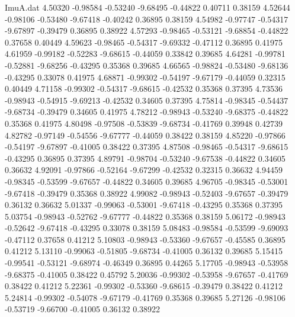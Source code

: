 \begin{filecontents}{ImuA.dat}
   4.50320   -0.98584   -0.53240   -9.68495   -0.44822    0.40711    0.38159
   4.52644   -0.98106   -0.53480   -9.67418   -0.40242    0.36895    0.38159
   4.54982   -0.97747   -0.54317   -9.67897   -0.39479    0.36895    0.38922
   4.57293   -0.98465   -0.53121   -9.68854   -0.44822    0.37658    0.40449
   4.59623   -0.98465   -0.54317   -9.69332   -0.47112    0.36895    0.41975
   4.61959   -0.99182   -0.52283   -9.68615   -0.44059    0.33842    0.39685
   4.64281   -0.99781   -0.52881   -9.68256   -0.43295    0.35368    0.39685
   4.66565   -0.98824   -0.53480   -9.68136   -0.43295    0.33078    0.41975
   4.68871   -0.99302   -0.54197   -9.67179   -0.44059    0.32315    0.40449
   4.71158   -0.99302   -0.54317   -9.68615   -0.42532    0.35368    0.37395
   4.73536   -0.98943   -0.54915   -9.69213   -0.42532    0.34605    0.37395
   4.75814   -0.98345   -0.54437   -9.68734   -0.39479    0.34605    0.41975
   4.78212   -0.98943   -0.53240   -9.68375   -0.44822    0.35368    0.41975
   4.80498   -0.97508   -0.53839   -9.68734   -0.41769    0.39948    0.42739
   4.82782   -0.97149   -0.54556   -9.67777   -0.44059    0.38422    0.38159
   4.85220   -0.97866   -0.54197   -9.67897   -0.41005    0.38422    0.37395
   4.87508   -0.98465   -0.54317   -9.68615   -0.43295    0.36895    0.37395
   4.89791   -0.98704   -0.53240   -9.67538   -0.44822    0.34605    0.36632
   4.92091   -0.97866   -0.52164   -9.67299   -0.42532    0.32315    0.36632
   4.94459   -0.98345   -0.53599   -9.67657   -0.44822    0.34605    0.39685
   4.96705   -0.98345   -0.53001   -9.67418   -0.39479    0.35368    0.38922
   4.99082   -0.98943   -0.52403   -9.67657   -0.39479    0.36132    0.36632
   5.01337   -0.99063   -0.53001   -9.67418   -0.43295    0.35368    0.37395
   5.03754   -0.98943   -0.52762   -9.67777   -0.44822    0.35368    0.38159
   5.06172   -0.98943   -0.52642   -9.67418   -0.43295    0.33078    0.38159
   5.08483   -0.98584   -0.53599   -9.69093   -0.47112    0.37658    0.41212
   5.10803   -0.98943   -0.53360   -9.67657   -0.45585    0.36895    0.41212
   5.13110   -0.99063   -0.51805   -9.68734   -0.41005    0.36132    0.39685
   5.15415   -0.99541   -0.53121   -9.68974   -0.46349    0.36895    0.44265
   5.17705   -0.98943   -0.53958   -9.68375   -0.41005    0.38422    0.45792
   5.20036   -0.99302   -0.53958   -9.67657   -0.41769    0.38422    0.41212
   5.22361   -0.99302   -0.53360   -9.68615   -0.39479    0.38422    0.41212
   5.24814   -0.99302   -0.54078   -9.67179   -0.41769    0.35368    0.39685
   5.27126   -0.98106   -0.53719   -9.66700   -0.41005    0.36132    0.38922

\end{filecontents}
